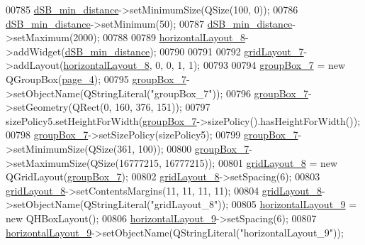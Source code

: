 \begin{DoxyCode}
00785         \hyperlink{a00080_a01c23085590f4947828948bbd9f50cc7}{dSB\_min\_distance}->setMinimumSize(QSize(100, 0));
00786         \hyperlink{a00080_a01c23085590f4947828948bbd9f50cc7}{dSB\_min\_distance}->setMinimum(50);
00787         \hyperlink{a00080_a01c23085590f4947828948bbd9f50cc7}{dSB\_min\_distance}->setMaximum(2000);
00788 
00789         \hyperlink{a00080_a8ead8fc876ee91c30864822eedb9c370}{horizontalLayout\_8}->addWidget(\hyperlink{a00080_a01c23085590f4947828948bbd9f50cc7}{dSB\_min\_distance});
00790 
00791 
00792         \hyperlink{a00080_a4c2d544352d423a361b8ab2e1d5636ec}{gridLayout\_7}->addLayout(\hyperlink{a00080_a8ead8fc876ee91c30864822eedb9c370}{horizontalLayout\_8}, 0, 0, 1, 1);
00793 
00794         \hyperlink{a00080_a269faaef68e4ad4784635810fcae5698}{groupBox\_7} = \textcolor{keyword}{new} QGroupBox(\hyperlink{a00080_ad52b1b3da7f1a695b9d3b521254c961d}{page\_4});
00795         \hyperlink{a00080_a269faaef68e4ad4784635810fcae5698}{groupBox\_7}->setObjectName(QStringLiteral(\textcolor{stringliteral}{"groupBox\_7"}));
00796         \hyperlink{a00080_a269faaef68e4ad4784635810fcae5698}{groupBox\_7}->setGeometry(QRect(0, 160, 376, 151));
00797         sizePolicy5.setHeightForWidth(\hyperlink{a00080_a269faaef68e4ad4784635810fcae5698}{groupBox\_7}->sizePolicy().hasHeightForWidth());
00798         \hyperlink{a00080_a269faaef68e4ad4784635810fcae5698}{groupBox\_7}->setSizePolicy(sizePolicy5);
00799         \hyperlink{a00080_a269faaef68e4ad4784635810fcae5698}{groupBox\_7}->setMinimumSize(QSize(361, 100));
00800         \hyperlink{a00080_a269faaef68e4ad4784635810fcae5698}{groupBox\_7}->setMaximumSize(QSize(16777215, 16777215));
00801         \hyperlink{a00080_a20728ed83bf740332bd908ea3e15ace6}{gridLayout\_8} = \textcolor{keyword}{new} QGridLayout(\hyperlink{a00080_a269faaef68e4ad4784635810fcae5698}{groupBox\_7});
00802         \hyperlink{a00080_a20728ed83bf740332bd908ea3e15ace6}{gridLayout\_8}->setSpacing(6);
00803         \hyperlink{a00080_a20728ed83bf740332bd908ea3e15ace6}{gridLayout\_8}->setContentsMargins(11, 11, 11, 11);
00804         \hyperlink{a00080_a20728ed83bf740332bd908ea3e15ace6}{gridLayout\_8}->setObjectName(QStringLiteral(\textcolor{stringliteral}{"gridLayout\_8"}));
00805         \hyperlink{a00080_ab48e49d68609b4c66e5169e2f87e3eb9}{horizontalLayout\_9} = \textcolor{keyword}{new} QHBoxLayout();
00806         \hyperlink{a00080_ab48e49d68609b4c66e5169e2f87e3eb9}{horizontalLayout\_9}->setSpacing(6);
00807         \hyperlink{a00080_ab48e49d68609b4c66e5169e2f87e3eb9}{horizontalLayout\_9}->setObjectName(QStringLiteral(\textcolor{stringliteral}{"horizontalLayout\_9"}));

\end{DoxyCode}
